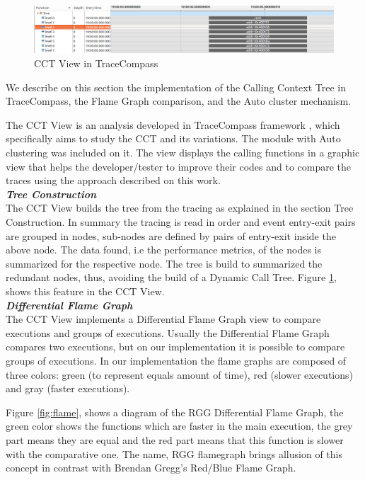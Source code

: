 \begin{figure}[t!]
  \centering
    \includegraphics[width=1.0\columnwidth]{figures/cct_view.png}
    \caption{CCT View in TraceCompass }
    \label{fig:cct_view}
    \vspace{-10pt}
\end{figure}

We describe on this section the implementation of the Calling Context Tree in TraceCompass, the Flame Graph comparison, and the Auto cluster mechanism.

The CCT View is an analysis developed in TraceCompass framework \cite{tracecompass}, which specifically aims to study the CCT and its variations. The module with Auto clustering was included on it. The view displays the calling functions in a graphic view that helps the developer/tester to improve their codes and to compare the traces using the approach described on this work.\\

\textbf{\textit{Tree Construction}}\\
The CCT View builds the tree from the tracing as explained in the section Tree Construction. In summary the tracing is read in order and event entry-exit pairs are grouped in nodes, sub-nodes are defined by pairs of entry-exit inside the above node. The data found, i.e the performance metrics, of the nodes is summarized for the respective node. The tree is build to summarized the redundant nodes, thus, avoiding the build of a Dynamic Call Tree. Figure \ref{fig:cct_view}, shows this feature in the CCT View.\\

\textbf{\textit{Differential Flame Graph}}\\
The CCT View implements a Differential Flame Graph view to compare executions and groups of executions. Usually the Differential Flame Graph compares two executions, but on our implementation it is possible to compare groups of executions. In our implementation the flame graphs are composed of three colors: green (to represent equals amount of time), red (slower executions) and gray (faster executions). 

Figure \ref{fig:flame}, shows a diagram of the RGG Differential Flame Graph, the green color shows the functions which are faster in the main execution, the grey part means they are equal and the red part means that this function is slower with the comparative one. The name, RGG flamegraph brings allusion of this concept in contrast with Brendan Gregg's Red/Blue Flame Graph. 
 

